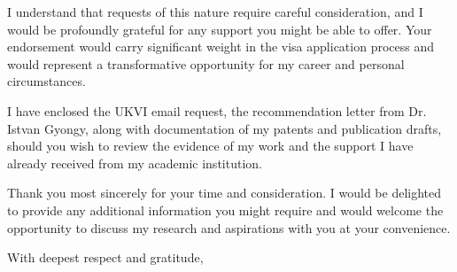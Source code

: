 \documentclass[12pt,a4paper]{letter}
\begin{document}
\begin{letter}
I understand that requests of this nature require careful consideration, and I would be profoundly grateful for any support you might be able to offer. Your endorsement would carry significant weight in the visa application process and would represent a transformative opportunity for my career and personal circumstances.

I have enclosed the UKVI email request, the recommendation letter from Dr. Istvan Gyongy, along with documentation of my patents and publication drafts, should you wish to review the evidence of my work and the support I have already received from my academic institution.

Thank you most sincerely for your time and consideration. I would be delighted to provide any additional information you might require and would welcome the opportunity to discuss my research and aspirations with you at your convenience.

\closing{With deepest respect and gratitude,}

\signature{Deborah Akuoko}


\end{letter}
\end{document}
